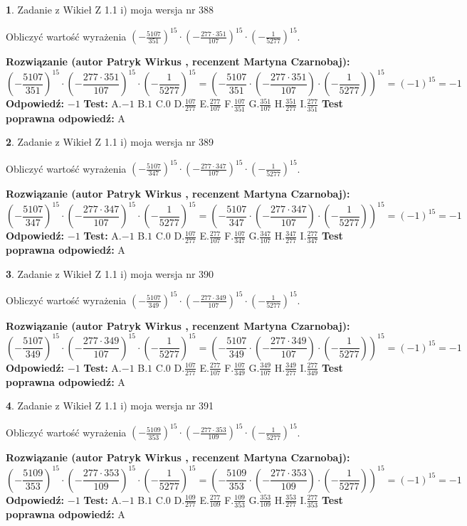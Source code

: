 \documentclass[12pt, a4paper]{article}
\theoremstyle{definition} %
\newtheorem{zad}{}
\newcommand{\zadStart}[1]{\begin{zad}#1\newline}
\newcommand{\zadStop}{\end{zad}}
\newcommand{\rozwStart}[2]{\noindent \textbf{Rozwiązanie (autor #1 , recenzent #2): }\newline}
\newcommand{\rozwStop}{\newline}
\newcommand{\odpStart}{\noindent \textbf{Odpowiedź:}\newline}
\newcommand{\odpStop}{\newline}
\newcommand{\testStart}{\noindent \textbf{Test:}\newline}
\newcommand{\testStop}{\newline}
\newcommand{\kluczStart}{\noindent \textbf{Test poprawna odpowiedź:}\newline}
\newcommand{\kluczStop}{\newline}
\begin{document}
\zadStart{Zadanie z Wikieł Z 1.1 i) moja wersja nr 388}

Obliczyć wartość wyrażenia $(-\frac{5107}{351})^{15} \cdot (-\frac{277 \cdot 351}{107})^{15} \cdot (-\frac{1}{5277})^{15}$.
\zadStop
\rozwStart{Patryk Wirkus}{Martyna Czarnobaj}
$$(-\frac{5107}{351})^{15} \cdot (-\frac{277 \cdot 351}{107})^{15} \cdot (-\frac{1}{5277})^{15} = (-\frac{5107}{351} \cdot (-\frac{277 \cdot 351}{107}) \cdot (-\frac{1}{5277}))^{15} = (-1)^{15} = -1$$
\rozwStop
\odpStart
$-1$
\odpStop
\testStart
A.$-1$ B.$1$ C.$0$ D.$\frac{107}{277}$ E.$\frac{277}{107}$
F.$\frac{107}{351}$ G.$\frac{351}{107}$
H.$\frac{351}{277}$
I.$\frac{277}{351}$
\testStop
\kluczStart
A
\kluczStop



\zadStart{Zadanie z Wikieł Z 1.1 i) moja wersja nr 389}

Obliczyć wartość wyrażenia $(-\frac{5107}{347})^{15} \cdot (-\frac{277 \cdot 347}{107})^{15} \cdot (-\frac{1}{5277})^{15}$.
\zadStop
\rozwStart{Patryk Wirkus}{Martyna Czarnobaj}
$$(-\frac{5107}{347})^{15} \cdot (-\frac{277 \cdot 347}{107})^{15} \cdot (-\frac{1}{5277})^{15} = (-\frac{5107}{347} \cdot (-\frac{277 \cdot 347}{107}) \cdot (-\frac{1}{5277}))^{15} = (-1)^{15} = -1$$
\rozwStop
\odpStart
$-1$
\odpStop
\testStart
A.$-1$ B.$1$ C.$0$ D.$\frac{107}{277}$ E.$\frac{277}{107}$
F.$\frac{107}{347}$ G.$\frac{347}{107}$
H.$\frac{347}{277}$
I.$\frac{277}{347}$
\testStop
\kluczStart
A
\kluczStop



\zadStart{Zadanie z Wikieł Z 1.1 i) moja wersja nr 390}

Obliczyć wartość wyrażenia $(-\frac{5107}{349})^{15} \cdot (-\frac{277 \cdot 349}{107})^{15} \cdot (-\frac{1}{5277})^{15}$.
\zadStop
\rozwStart{Patryk Wirkus}{Martyna Czarnobaj}
$$(-\frac{5107}{349})^{15} \cdot (-\frac{277 \cdot 349}{107})^{15} \cdot (-\frac{1}{5277})^{15} = (-\frac{5107}{349} \cdot (-\frac{277 \cdot 349}{107}) \cdot (-\frac{1}{5277}))^{15} = (-1)^{15} = -1$$
\rozwStop
\odpStart
$-1$
\odpStop
\testStart
A.$-1$ B.$1$ C.$0$ D.$\frac{107}{277}$ E.$\frac{277}{107}$
F.$\frac{107}{349}$ G.$\frac{349}{107}$
H.$\frac{349}{277}$
I.$\frac{277}{349}$
\testStop
\kluczStart
A
\kluczStop



\zadStart{Zadanie z Wikieł Z 1.1 i) moja wersja nr 391}

Obliczyć wartość wyrażenia $(-\frac{5109}{353})^{15} \cdot (-\frac{277 \cdot 353}{109})^{15} \cdot (-\frac{1}{5277})^{15}$.
\zadStop
\rozwStart{Patryk Wirkus}{Martyna Czarnobaj}
$$(-\frac{5109}{353})^{15} \cdot (-\frac{277 \cdot 353}{109})^{15} \cdot (-\frac{1}{5277})^{15} = (-\frac{5109}{353} \cdot (-\frac{277 \cdot 353}{109}) \cdot (-\frac{1}{5277}))^{15} = (-1)^{15} = -1$$
\rozwStop
\odpStart
$-1$
\odpStop
\testStart
A.$-1$ B.$1$ C.$0$ D.$\frac{109}{277}$ E.$\frac{277}{109}$
F.$\frac{109}{353}$ G.$\frac{353}{109}$
H.$\frac{353}{277}$
I.$\frac{277}{353}$
\testStop
\kluczStart
A
\kluczStop
\end{document}
